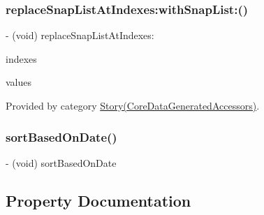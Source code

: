 \hypertarget{interface_story_a4cbef9206e2e91b3fdadd1fd93a722d1}{}\label{interface_story_a4cbef9206e2e91b3fdadd1fd93a722d1} 
\subsubsection{\texorpdfstring{replace\+Snap\+List\+At\+Indexes\+:with\+Snap\+List\+:()}{replaceSnapListAtIndexes:withSnapList:()}}
{\footnotesize\ttfamily -\/ (void) replace\+Snap\+List\+At\+Indexes\+: \begin{DoxyParamCaption}\item[{(N\+S\+Index\+Set $\ast$)}]{indexes }\item[{withSnapList:(N\+S\+Array$<$ \hyperlink{interface_snap}{Snap} $\ast$ $>$ $\ast$)}]{values }\end{DoxyParamCaption}}



Provided by category \hyperlink{category_story_07_core_data_generated_accessors_08_a4cbef9206e2e91b3fdadd1fd93a722d1}{Story(\+Core\+Data\+Generated\+Accessors)}.

\hypertarget{interface_story_a7279a90208496b9f6040b62dfbdac620}{}\label{interface_story_a7279a90208496b9f6040b62dfbdac620} 
\subsubsection{\texorpdfstring{sort\+Based\+On\+Date()}{sortBasedOnDate()}}
{\footnotesize\ttfamily -\/ (void) sort\+Based\+On\+Date \begin{DoxyParamCaption}{ }\end{DoxyParamCaption}}



\subsection{Property Documentation}
\hypertarget{interface_story_a1d58b14f07e9d3fbab4a4703a066bfc2}{}\label{interface_story_a1d58b14f07e9d3fbab4a4703a066bfc2} 
